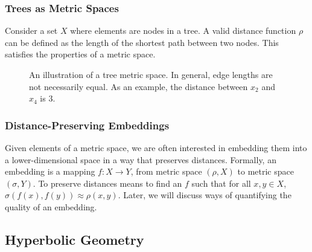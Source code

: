 \documentclass{article}
\begin{document}
\subsubsection{Trees as Metric Spaces}

Consider a set $X$ where elements are nodes in a tree. A valid distance function $\rho$ can be defined as the length of the shortest path between two nodes. This satisfies the properties of a metric space.

\begin{figure}[h]
  \centering
  \caption{An illustration of a tree metric space. In general, edge lengths are not necessarily equal. As an example, the distance between $x_2$ and $x_4$ is $3$.}
  \label{fig:tree-metric-space}
\end{figure}

\subsubsection{Distance-Preserving Embeddings}

Given elements of a metric space, we are often interested in embedding them into a lower-dimensional space in a way that preserves distances. Formally, an embedding is a mapping $f: X \rightarrow Y$, from metric space $(\rho, X)$ to metric space $(\sigma, Y)$. To preserve distances means to find an $f$ such that for all $x,y \in X$, $\sigma(f(x),f(y)) \approx \rho(x,y)$. Later, we will discuss ways of quantifying the quality of an embedding.

\subsection{Hyperbolic Geometry}
\end{document}
